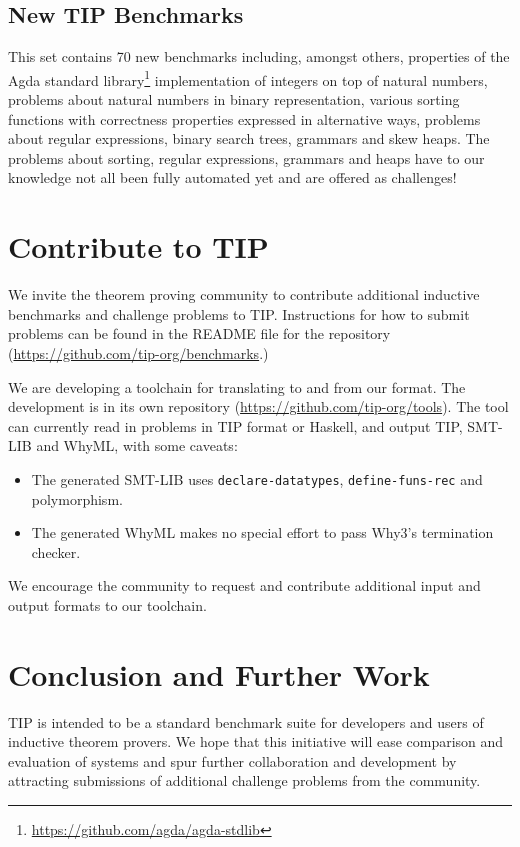 \documentclass{llncs}
\begin{document}
\subsection{New TIP Benchmarks}
This set contains 70 new benchmarks including, amongst others,
properties of the Agda standard
library\footnote{\url{https://github.com/agda/agda-stdlib}}
implementation of integers on top of natural numbers, problems about natural numbers in binary representation, various sorting functions with correctness properties expressed in alternative ways, problems about regular expressions, binary search trees, grammars and skew heaps. The problems about sorting, regular expressions, grammars and heaps have to our knowledge not all been fully automated yet and are offered as challenges!

\section{Contribute to TIP}
We invite the theorem proving community to contribute additional inductive
benchmarks and challenge problems to TIP. Instructions for how to submit
problems can be found in the README file for the repository
(\url{https://github.com/tip-org/benchmarks}.)

We are developing a toolchain for translating to and from our format. The
development is in its own repository
(\url{https://github.com/tip-org/tools}).
The tool can currently read in problems in TIP format or Haskell, and
output TIP, SMT-LIB and WhyML, with some caveats:
\begin{itemize}
  \item The generated SMT-LIB uses \verb|declare-datatypes|,
    \verb|define-funs-rec| and polymorphism.
  \item The generated WhyML makes no special effort to pass Why3's
    termination checker.
\end{itemize}
We encourage the community to request and contribute additional input
and output formats to our toolchain.

\section{Conclusion and Further Work}
TIP is intended to be a standard benchmark suite for developers and users of inductive theorem provers. We hope that this initiative will ease comparison and evaluation of systems and spur further collaboration and development by attracting submissions of additional challenge problems from the community.
\end{document}

